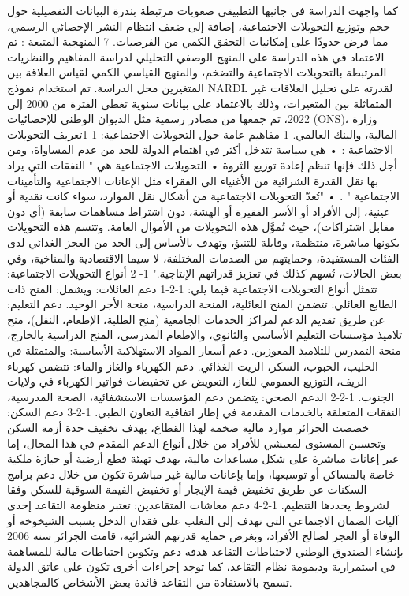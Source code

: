 \documentclass[12pt,a4paper]{report}
\begin{document}
كما واجهت الدراسة في جانبها التطبيقي صعوبات مرتبطة بندرة البيانات التفصيلية حول حجم وتوزيع التحويلات الاجتماعية، إضافة إلى ضعف انتظام النشر الإحصائي الرسمي، مما فرض حدودًا على إمكانيات التحقق الكمي من الفرضيات.
7-المنهجية المتبعة : 
تم الاعتماد في هذه الدراسة على المنهج الوصفي التحليلي لدراسة المفاهيم والنظريات المرتبطة بالتحويلات الاجتماعية والتضخم، والمنهج القياسي الكمي لقياس العلاقة بين المتغيرين محل الدراسة.
تم استخدام نموذج NARDL لقدرته على تحليل العلاقات غير المتماثلة بين المتغيرات، وذلك بالاعتماد على بيانات سنوية تغطي الفترة من 2000 إلى 2022، تم جمعها من مصادر رسمية مثل الديوان الوطني للإحصائيات (ONS)، وزارة المالية، والبنك العالمي.
1-مفاهيم عامة حول التحويلات الاجتماعية: 
1-1تعريف التحويلات الاجتماعية :
• هي سياسة تتدخل أكثر في اهتمام الدولة للحد من عدم المساواة، ومن أجل ذلك فإنها تنظم إعادة توزيع الثروة
• التحويلات الاجتماعية هي " النفقات التي يراد بها نقل القدرة الشرائية من الأغنياء الى الفقراء مثل الإعانات الاجتماعية والتأمينات الاجتماعية " .
•  "تُعدّ التحويلات الاجتماعية من أشكال نقل الموارد، سواء كانت نقدية أو عينية، إلى الأفراد أو الأسر الفقيرة أو الهشة، دون اشتراط مساهمات سابقة (أي دون مقابل اشتراكات)، حيث تُموَّل هذه التحويلات من الأموال العامة. وتتسم هذه التحويلات بكونها مباشرة، منتظمة، وقابلة للتنبؤ، وتهدف بالأساس إلى الحد من العجز الغذائي لدى الفئات المستفيدة، وحمايتهم من الصدمات المختلفة، لا سيما الاقتصادية والمناخية، وفي بعض الحالات، تُسهم كذلك في تعزيز قدراتهم الإنتاجية."
1- 2 أنواع التحويلات الاجتماعية: 
تتمثل أنواع التحويلات الاجتماعية فيما يلي:
1-2-1 دعم العائلات: ويشمل:
﻿المنح ذات الطابع العائلي: تتضمن المنح العائلية، المنحة الدراسية، منحة الأجر الوحيد.
دعم التعليم: عن طريق تقديم الدعم لمراكز الخدمات الجامعية (منح الطلبة، الإطعام، النقل)، منح تلاميذ مؤسسات التعليم الأساسي والثانوي، والإطعام المدرسي، المنح الدراسية بالخارج، منحة التمدرس للتلاميذ المعوزين.
﻿﻿دعم أسعار المواد الاستهلاكية الأساسية: والمتمثلة في الحليب، الحبوب، السكر، الزيت الغذائي.
﻿﻿دعم الكهرباء والغاز والماء: تتضمن كهرباء الريف، التوزيع العمومي للغاز، التعويض عن تخفيضات فواتير الكهرباء في ولايات الجنوب.
1-2-2 الدعم الصحي: يتضمن دعم المؤسسات الاستشفائية، الصحة المدرسية، النفقات المتعلقة بالخدمات المقدمة في إطار اتفاقية التعاون الطبي.
1-2-3 دعم السكن: خصصت الجزائر موارد مالية ضخمة لهذا القطاع، بهدف تخفيف حدة أزمة السكن وتحسين المستوى لمعيشي للأفراد من خلال أنواع الدعم المقدم في هذا المجال، إما عبر إعانات مباشرة على شكل مساعدات مالية، بهدف تهيئة قطع أرضية أو حيازة ملكية خاصة بالمساكن أو توسيعها، وإما بإعانات مالية غير مباشرة تكون من خلال دعم برامج السكنات عن طريق تخفيض قيمة الإيجار أو تخفيض الفيمة السوقية للسكن وفقا لشروط يحددها التنظيم.
1-2-4 دعم معاشات المتقاعدين: تعتبر منظومة التقاعد إحدى آليات الضمان الاجتماعي التي تهدف إلى التغلب على فقدان الدخل بسبب الشيخوخة أو الوفاة أو العجز لصالح الأفراد، وبغرض حماية قدرتهم الشرائية، قامت الجزائر سنة 2006 بإنشاء الصندوق الوطني لاحتياطات التقاعد هدفه دعم وتكوين احتياطات مالية للمساهمة في استمرارية وديمومة نظام التقاعد، كما توجد إجراءات أخرى تكون على عاتق الدولة تسمح بالاستفادة من التقاعد فائدة بعض الأشخاص كالمجاهدين.
\end{document}
